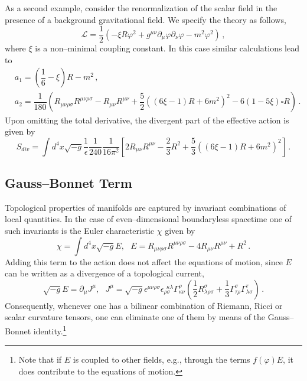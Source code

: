 \documentclass[12pt]{article}
\begin{document}
As a second example, consider the renormalization of the scalar field in the presence of a background gravitational field. We specify the theory as follows,
\begin{equation}
\mathcal{L}=\frac{1}{2}(-\xi R\varphi^2+g^{\mu\nu}\partial_\mu\varphi\partial_\nu\varphi-m^2\varphi^2) \,,
\end{equation}
where $\xi$ is a non--minimal coupling constant. In this case similar calculations lead to
\begin{equation}
\begin{split}
&a_1=\left(\dfrac{1}{6}-\xi\right)R-m^2\,,\\
&a_2=\dfrac{1}{180}\left(R_{\mu\nu\rho\sigma}R^{\mu\nu\rho\sigma}
-R_{\mu\nu}R^{\mu\nu}+\dfrac{5}{2}((6\xi-1)R+6m^2)^2
-6(1-5\xi)\square R\right)\,.
\end{split}
\end{equation}
Upon omitting the total derivative, the divergent part of the effective action is given by
\begin{equation}
S_{div}=\int d^4x\sqrt{-g}\dfrac{1}{\epsilon}\dfrac{1}{240}\dfrac{1}{16\pi^2}\left[2R_{\mu\nu}R^{\mu\nu}
-\frac{2}{3}
R^2+\dfrac{5}{3}((6\xi-1)R+6m^2)^2\right] \,.
\end{equation}

\subsection{Gauss--Bonnet Term}
\label{GBTerm}

Topological properties of manifolds are captured by invariant combinations of local quantities.
In the case of even--dimensional boundaryless spacetime one of such invariants is the Euler characteristic $\chi$ given by
\begin{equation}\label{GaussBonnetTerm}
\chi=\int d^4x \sqrt{-g}E,~~~E=R_{\mu\nu\rho\sigma}R^{\mu\nu\rho\sigma}-4R_{\mu\nu}R^{\mu\nu}+R^2 \,.
\end{equation}
Adding this term to the action does not affect the equations of motion, since $E$ can be written as a divergence of a topological current,
\begin{equation}
\sqrt{-g}E=\partial_\mu J^\mu,~~~ J^\mu=\sqrt{-g}\epsilon^{\mu\nu\rho\sigma}\epsilon_{\rho\sigma}^{~~\kappa\lambda}\Gamma^\rho_{\kappa\nu}\left(\dfrac{1}{2}R^\sigma_{\lambda\rho\sigma}+\dfrac{1}{3}\Gamma^\sigma_{\tau\rho}\Gamma^\tau_{\lambda\sigma}\right) \,.
\end{equation}
Consequently, whenever one has a bilinear combination of Riemann, Ricci or scalar curvature tensors, one can eliminate one of them by means of the Gauss--Bonnet identity.\footnote{Note that if $E$ is coupled to other fields, e.g., through the terms $f(\varphi)E$, it does contribute to the equations of motion.}
\end{document}
